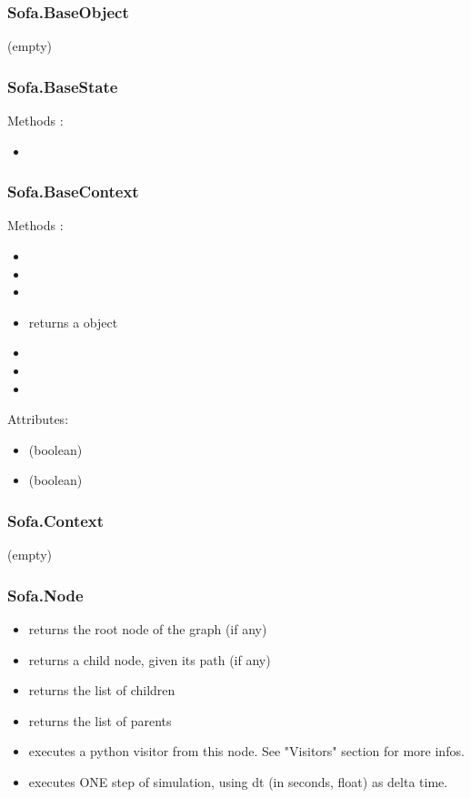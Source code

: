 \subsubsection{Sofa.BaseObject}
(empty)

\subsubsection{Sofa.BaseState}
Methods :
\begin{itemize}
\item {}
\end{itemize}

\subsubsection{Sofa.BaseContext}
Methods :
\begin{itemize}
\item {} 
\item {} 
\item {} 
\item {} returns a  object
\item {} 
\item {}
\item {}
\end{itemize}
Attributes:
\begin{itemize}
\item {}  (boolean)
\item {}  (boolean)
\end{itemize}


\subsubsection{Sofa.Context}
(empty)
\subsubsection{Sofa.Node}
\begin{itemize}
\item {} returns the root node of the graph (if any) 
\item {} returns a child node, given its path (if any) 
\item {} returns the list of children 
\item {} returns the list of parents
\item {} executes a python visitor from this node. See "Visitors" section for more infos.
\item {} executes ONE step of simulation, using dt (in seconds, float) as delta time. 
\end{itemize}
